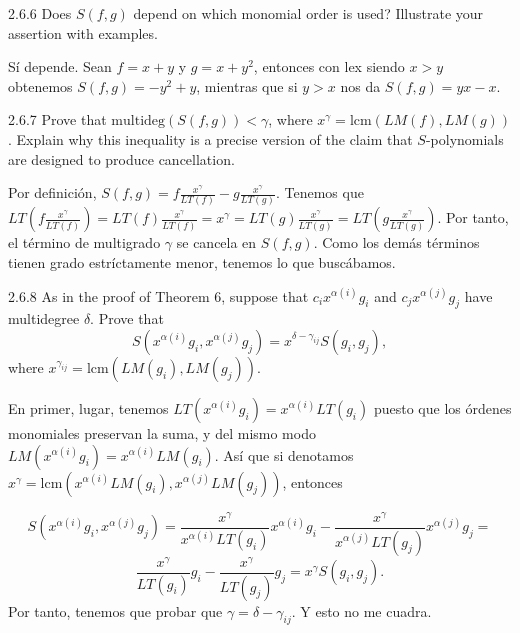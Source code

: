 \documentclass[twoside]{article}
\begin{document}
\newpage

\begin{ejercicio}{2.6.6}
Does $S( f , g)$ depend on which monomial order is used? Illustrate your assertion with
examples.
\end{ejercicio}
\begin{solucion}
Sí depende. Sean $f=x+y$ y $g=x+y^2$, entonces con lex siendo $x>y$ obtenemos $S(f,g)=-y^2+y$, mientras que si $y>x$ nos da $S(f,g)=yx-x$.
\end{solucion}

\newpage

\begin{ejercicio}{2.6.7}
Prove that $\mathrm{multideg}(S( f , g)) < γ$, where $x^γ = \mathrm{lcm}(LM( f ), LM(g))$. Explain why this
inequality is a precise version of the claim that $S$-polynomials are designed to produce
cancellation.
\end{ejercicio}
\begin{solucion}
Por definición, $S(f,g)=f\frac{x^{\gamma}}{LT(f)}-g\frac{x^{\gamma}}{LT(g)}$. Tenemos que $LT\left(f\frac{x^{\gamma}}{LT(f)}\right)=LT(f)\frac{x^{\gamma}}{LT(f)}=x^{\gamma}=LT(g)\frac{x^{\gamma}}{LT(g)}=LT\left(g\frac{x^{\gamma}}{LT(g)}\right)$. Por tanto, el término de multigrado $\gamma$ se cancela en $S(f,g)$. Como los demás términos tienen grado estríctamente menor, tenemos lo que buscábamos.
\end{solucion}

\newpage

\begin{ejercicio}{2.6.8}
As in the proof of Theorem 6, suppose that $c_ix^{α(i)}g_i$ and $c_jx^{α(j)}g_j$ have multidegree $δ$.
Prove that
$$S(x^{α(i)}g_i, x^{α(j)}g_j) = x^{δ−γ_{ij}}S(g_i, g_j),$$
where $x^{γ_{ij}} = \mathrm{lcm}(LM(g_i), LM(g_j))$.
\end{ejercicio}
\begin{solucion}
En primer, lugar, tenemos $LT(x^{\alpha(i)}g_i)=x^{\alpha(i)}LT(g_i)$ puesto que los órdenes monomiales preservan la suma, y del mismo modo $LM(x^{\alpha(i)}g_i)=x^{\alpha(i)}LM(g_i)$. Así que si denotamos $x^{\gamma}=\mathrm{lcm}(x^{α(i)}LM(g_i),x^{α(j)}LM(g_j))$, entonces 

$$S(x^{α(i)}g_i, x^{α(j)}g_j)=\frac{x^{\gamma}}{x^{\alpha(i)}LT(g_i)}x^{α(i)}g_i-\frac{x^{\gamma}}{x^{\alpha(j)}LT(g_j)}x^{α(j)}g_j=$$
$$\frac{x^{\gamma}}{LT(g_i)}g_i-\frac{x^{\gamma}}{LT(g_j)}g_j=x^{\gamma}S(g_i,g_j).$$
Por tanto, tenemos que probar que $\gamma=\delta-\gamma_{ij}$. Y esto no me cuadra.
\end{solucion}
\end{document}
